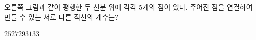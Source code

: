 \hspace*{2mm}\begin{minipage}[t]{\dimexpr\linewidth-2mm\relax}\vspace{0pt}
\noindent\begin{minipage}[t]{0.58\linewidth}\vspace{0pt}\raggedright 오른쪽 그림과 같이 평행한 두 선분 위에 각각 $5$개의 점이 있다. 주어진 점을 연결하여 만들 수 있는 서로 다른 직선의 개수는?\end{minipage}\hfill\begin{minipage}[t]{0.4\linewidth}\vspace{0pt}\centering \resizebox{\ifdim\width>\linewidth\linewidth\else\width\fi}{!}{}\end{minipage}\par
\begin{choicesii}{$25$}{$27$}{$29$}{$31$}{$33$}\end{choicesii}\end{minipage}
